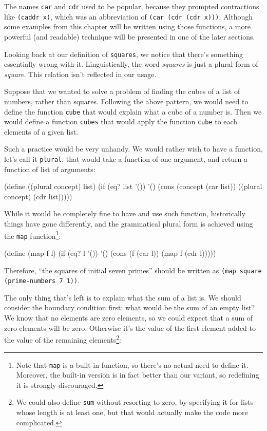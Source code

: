 The names \texttt{car} and \texttt{cdr} used to be popular, because
they prompted contractions like \texttt{(caddr x)}, which was an
abbreviation of \texttt{(car (cdr (cdr x)))}. Although some examples
from this chapter will be written using those functions, a more
powerful (and readable) technique will be presented in one of
the later sections.

Looking back at our definition of \texttt{squares}, we notice
that there's something essentially wrong with it. Linguistically,
the word \textit{squares} is just a plural form of \textit{square}.
This relation isn't reflected in our usage.

Suppose that we wanted to solve a problem of finding the cubes
of a list of numbers, rather than squares. Following the above
pattern, we would need to define the function \texttt{cube} that
would explain what a cube of a number is. Then we would define
a function \texttt{cubes} that would apply the function \texttt{cube}
to each elements of a given list.

Such a practice would be very unhandy. We would rather wish to
have a function, let's call it \texttt{plural}, that would take
a function of one argument, and return a function of list of
arguments:

\begin{Snippet}
(define ((plural concept) list)
  (if (eq? list '())
    '()
    (cons (concept (car list)) ((plural concept) (cdr list)))))
\end{Snippet}

While it would be completely fine to have and use such function,
historically things have gone differently, and the grammatical plural
form is achieved using the \texttt{map} function\footnote{Note that
\texttt{map} is a built-in function, so there's no actual need to
define it. Moreover, the built-in version is in fact better than
our variant, so redefining it is strongly discouraged.}:

\begin{Snippet}
(define (map f l)
  (if (eq? l '())
    '()
    (cons (f (car l)) (map f (cdr l)))))
\end{Snippet}

Therefore, ``the squares of initial seven primes'' should be written
as \texttt{(map square (prime-numbers 7 1))}.

The only thing that's left is to explain what the sum of a list is.
We should consider the boundary condition first: what would be the
sum of an empty list? We know that no elements are zero elements,
so we could expect that a sum of zero elements will be zero. Otherwise
it's the value of the first element added to the value of the
remaining elements\footnote{We could also define \texttt{sum}
without resorting to zero, by specifying it for lists whose length
is at least one, but that would actually make the code more
complicated.}:

